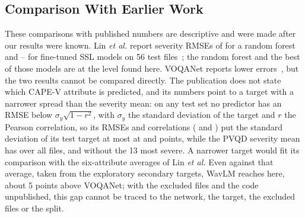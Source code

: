 \documentclass[journal]{IEEEtran}
\begin{document}
\subsection{Comparison With Earlier Work}\label{sec:prior}
These comparisons with published numbers are descriptive and were made after our results were known. Lin \emph{et al.} report severity RMSEs of \linSeverityRfRmse{} for a random forest and \linSeveritySslRmseLow{}--\linSeveritySslRmseHigh{} for fine-tuned SSL models on 56 test files~\cite{lin2024lightly}; the random forest and the best of those models are at the level found here. VOQANet reports lower errors~\cite{ariyanti2026voqanet}, but the two results cannot be compared directly. The publication does not state which CAPE-V attribute is predicted, and its numbers point to a target with a narrower spread than the severity mean: on any test set no predictor has an RMSE below $\sigma_y\sqrt{1-r^2}$, with $\sigma_y$ the standard deviation of the target and $r$ the Pearson correlation, so its RMSEs and correlations (\vqWhisperR{} and \vqWavLMR{}) put the standard deviation of its test target at most at \vqWhisperBound{} and \vqWavLMBound{} points, while the PVQD severity mean has \severitySdPopAll{} over all \filesTotal{} files, and \severitySdDroponethree{} without the 13 most severe. A narrower target would fit its comparison with the six-attribute averages of Lin \emph{et al.} Even against that average, taken from the exploratory secondary targets, WavLM reaches \sixdimAfiveRmse{} here, about 5 points above VOQANet; with the excluded files and the code unpublished, this gap cannot be traced to the network, the target, the excluded files or the split.
\end{document}
